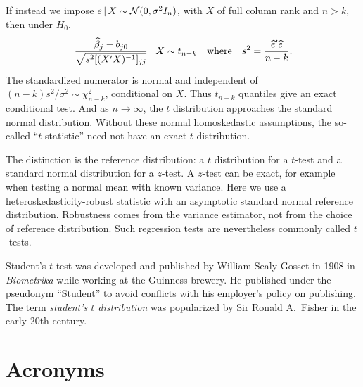 \documentclass[a4paper,12pt]{article}
\begin{document}
\begin{remark}
	If instead we impose $e\given X\sim\normaldistribution(0,\sigma^2I_n)$,
	with $X$ of full column rank and $n>k$, then under $H_0$,
	\begin{align}
		\left.\frac{\widehat\beta_j-b_{j0}}{\sqrt{s^2[(X\T X)\inv]_{jj}}}\given[\right] X\sim t_{n-k}
		\quad\text{where}\quad
		s^2=\frac{\widehat e\T\widehat e}{n-k}.
	\end{align}
	The standardized numerator is normal and independent of
	$(n-k)s^2/\sigma^2\sim\chi_{n-k}^2$, conditional on $X$.
	Thus $t_{n-k}$ quantiles give an exact conditional test.
	And as $n\to\infty$, the $t$ distribution approaches the standard normal distribution.
	Without these normal homoskedastic assumptions,
	the so-called ``$t$-statistic'' need not have an exact $t$ distribution.
\end{remark}

\begin{remark}
	The distinction is the reference distribution: a $t$ distribution for a $t$-test and a standard normal distribution for a $z$-test.
	A $z$-test can be exact, for example when testing a normal mean with known variance.
	Here we use a heteroskedasticity-robust statistic with an asymptotic standard normal reference distribution.
	Robustness comes from the variance estimator, not from the choice of reference distribution.
	Such regression tests are nevertheless commonly called $t$-tests.
\end{remark}

\begin{remark}
	Student's $t$-test was developed and published by William Sealy Gosset in 1908 in \emph{Biometrika} while working at the Guinness brewery.
	He published under the pseudonym ``Student'' to avoid conflicts with his employer's policy on publishing.
	The term \emph{student's $t$ distribution} was popularized by Sir Ronald A.\ Fisher in the early 20th century.
\end{remark}

\vfill
\section*{Acronyms}
\printglossaries
\end{document}
